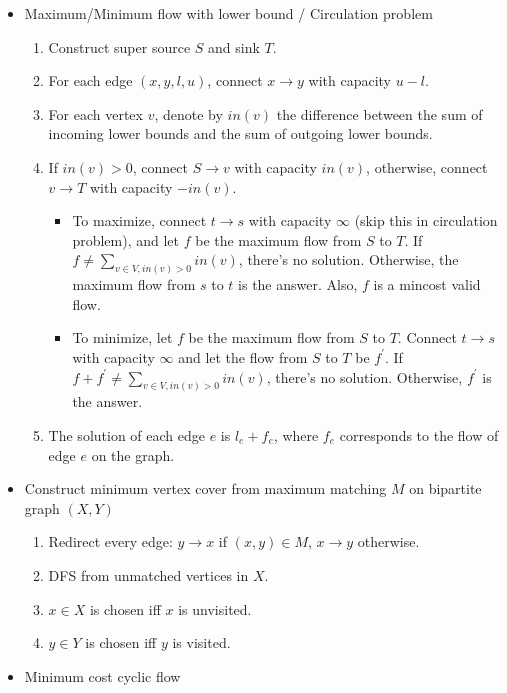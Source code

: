 \begin{itemize}[nosep]
  \item Maximum/Minimum flow with lower bound / Circulation problem
    \begin{enumerate}[nosep]
      \item Construct super source $S$ and sink $T$.
      \item For each edge $(x, y, l, u)$, connect $x \rightarrow y$ with capacity $u - l$.
      \item For each vertex $v$, denote by $in(v)$ the difference between the sum of incoming lower bounds and the sum of outgoing lower bounds.
      \item If $in(v) > 0$, connect $S \rightarrow v$ with capacity $in(v)$, otherwise, connect $v \rightarrow T$ with capacity $-in(v)$.
        \begin{itemize}[nosep]
          \item To maximize, connect $t \rightarrow s$ with capacity $\infty$ (skip this in circulation problem), and let $f$ be the maximum flow from $S$ to $T$. If $f \neq \sum_{v \in V, in(v) > 0}{in(v)}$, there's no solution. Otherwise, the maximum flow from $s$ to $t$ is the answer. Also, $f$ is a mincost valid flow.
          \item To minimize, let $f$ be the maximum flow from $S$ to $T$. Connect $t \rightarrow s$ with capacity $\infty$ and let the flow from $S$ to $T$ be $f^\prime$. If $f + f^\prime \neq \sum_{v \in V, in(v) > 0}{in(v)}$, there's no solution. Otherwise, $f^\prime$ is the answer.
        \end{itemize}
      \item The solution of each edge $e$ is $l_e + f_e$, where $f_e$ corresponds to the flow of edge $e$ on the graph.
    \end{enumerate}
  \item Construct minimum vertex cover from maximum matching $M$ on bipartite graph $(X, Y)$
    \begin{enumerate}[nosep]
      \item Redirect every edge: $y \rightarrow x$ if $(x, y) \in M$, $x \rightarrow y$ otherwise.
      \item DFS from unmatched vertices in $X$.
      \item $x \in X$ is chosen iff $x$ is unvisited.
      \item $y \in Y$ is chosen iff $y$ is visited.
    \end{enumerate}
  \item Minimum cost cyclic flow

\end{itemize}
